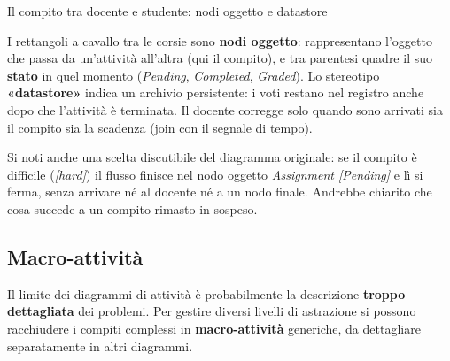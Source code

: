 \begin{esempio}{Il compito tra docente e studente: nodi oggetto e datastore}
\begin{center}
\end{center}
I rettangoli a cavallo tra le corsie sono \textbf{nodi oggetto}: rappresentano l'oggetto che passa da un'attività all'altra (qui il
compito), e tra parentesi quadre il suo \textbf{stato} in quel momento (\textit{Pending}, \textit{Completed}, \textit{Graded}).
Lo stereotipo \textbf{«datastore»} indica un archivio persistente: i voti restano nel registro anche dopo che l'attività è
terminata. Il docente corregge solo quando sono arrivati sia il compito sia la scadenza (join con il segnale di tempo).

Si noti anche una scelta discutibile del diagramma originale: se il compito è difficile (\textit{[hard]}) il flusso finisce nel
nodo oggetto \textit{Assignment [Pending]} e lì si ferma, senza arrivare né al docente né a un nodo finale. Andrebbe chiarito che
cosa succede a un compito rimasto in sospeso.
\end{esempio}


\subsection{Macro-attività}

Il limite dei diagrammi di attività è probabilmente la descrizione \textbf{troppo dettagliata} dei problemi. Per gestire diversi
livelli di astrazione si possono racchiudere i compiti complessi in \textbf{macro-attività} generiche, da dettagliare separatamente
in altri diagrammi.

